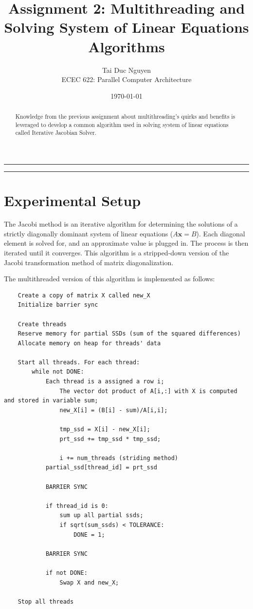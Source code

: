 \documentclass[letterpaper, 11pt]{article}
\title{Assignment 2: Multithreading and Solving System of Linear Equations Algorithms}
\author{
Tai Duc Nguyen \\
ECEC 622: Parallel Computer Architecture
}
\date{\AdvanceDate[-1]\today}
\begin{document}
\maketitle

\rule{\textwidth}{1pt}

\begin{abstract}
	Knowledge from the previous assignment about multithreading's quirks and benefits is leveraged to develop a common algorithm used in solving system of linear equations called Iterative Jacobian Solver. 
\end{abstract}

\rule{\textwidth}{1pt}

\section{Experimental Setup}

The Jacobi method is an iterative algorithm for determining the solutions of a strictly diagonally dominant system of linear equations ($A\boldsymbol{x}=B$). Each diagonal element is solved for, and an approximate value is plugged in. The process is then iterated until it converges. This algorithm is a stripped-down version of the Jacobi transformation method of matrix diagonalization.

The multithreaded version of this algorithm is implemented as follows:

\begin{lstlisting}
	Create a copy of matrix X called new_X
	Initialize barrier sync
	
	Create threads
	Reserve memory for partial SSDs (sum of the squared differences)
	Allocate memory on heap for threads' data
	
	Start all threads. For each thread:
		while not DONE:
			Each thread is a assigned a row i;
				The vector dot product of A[i,:] with X is computed and stored in variable sum;
				new_X[i] = (B[i] - sum)/A[i,i];
				
				tmp_ssd = X[i] - new_X[i];
				prt_ssd += tmp_ssd * tmp_ssd;
				
				i += num_threads (striding method)
			partial_ssd[thread_id] = prt_ssd
			
			BARRIER SYNC
			
			if thread_id is 0:
				sum up all partial ssds;
				if sqrt(sum_ssds) < TOLERANCE:
					DONE = 1;
			
			BARRIER SYNC
			
			if not DONE:
				Swap X and new_X;
		
	Stop all threads


\end{lstlisting}
\end{document}
